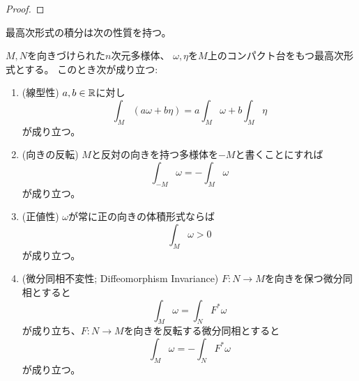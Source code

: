 \documentclass[report]{jlreq}
\begin{document}
\begin{proof}
    \TODO{}
\end{proof}

最高次形式の積分は次の性質を持つ。

\begin{proposition}[積分の基本性質]
    $M, N$を向きづけられた$n$次元多様体、
    $\omega, \eta$を$M$上のコンパクト台をもつ最高次形式とする。
    このとき次が成り立つ:
    \begin{enumerate}
        \item (線型性)
            $a, b \in \mathbb{R}$に対し
            \begin{equation}
                \int_M (a \omega + b \eta)
                    = a \int_M \omega + b \int_M \eta
            \end{equation}
            が成り立つ。
        \item (向きの反転)
            $M$と反対の向きを持つ多様体を$-M$と書くことにすれば
            \begin{equation}
                \int_{-M} \omega = - \int_M \omega
            \end{equation}
            が成り立つ。
        \item (正値性)
            $\omega$が常に正の向きの体積形式ならば
            \begin{equation}
                \int_M \omega > 0
            \end{equation}
            が成り立つ。
        \item (微分同相不変性; Diffeomorphism Invariance)
            $F \colon N \to M$を向きを保つ微分同相とすると
            \begin{equation}
                \int_M \omega = \int_N F^* \omega
            \end{equation}
            が成り立ち、$F \colon N \to M$を向きを反転する微分同相とすると
            \begin{equation}
                \int_M \omega = - \int_N F^* \omega
            \end{equation}
            が成り立つ。
    \end{enumerate}
\end{proposition}
\end{document}
